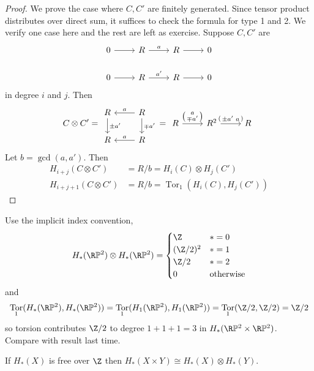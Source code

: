 \documentclass[a4paper]{article}
\renewcommand*{\P}{\mathbb{P}}
\DeclareMathOperator{\Tor}{Tor} %
\begin{document}
\begin{proof}
  We prove the case where \(C, C'\) are finitely generated. Since tensor product distributes over direct sum, it suffices to check the formula for type 1 and 2. We verify one case here and the rest are left as exercise. Suppose \(C, C'\) are
  \[
    \begin{tikzcd}
      0 \ar[r] & R \ar[r, "a"] & R \ar[r] & 0 \\
      0 \ar[r] & R \ar[r, "a'"] & R \ar[r] & 0
    \end{tikzcd}
  \]
  in degree \(i\) and \(j\). Then
  \[
    C \otimes C' =
    \begin{tikzcd}
      R \ar[d, "\pm a'"] & R \ar[d, "\mp a'"] \ar[l, "a"'] \\
      R & R \ar[l, "a"']
    \end{tikzcd}
    =
    \begin{tikzcd}[ampersand replacement=\&]
      R \ar[r, "\begin{psmallmatrix} a \\ \mp a' \end{psmallmatrix}"] \& R^2 \ar[r, "{\begin{psmallmatrix} \pm a' & a \end{psmallmatrix}}"] \& R
    \end{tikzcd}
  \]
  Let \(b = \gcd(a, a')\). Then
  \begin{align*}
    H_{i + j}(C \otimes C') &= R/b = H_i(C) \otimes H_j(C') \\
    H_{i + j + 1}(C \otimes C') &= R/b = \Tor_1(H_i(C), H_j(C'))
  \end{align*}
\end{proof}

\begin{eg}
  Use the implicit index convention,
  \[
    H_*(\R\P^2) \otimes H_*(\R\P^2) =
    \begin{cases}
      \Z & * = 0 \\
      (\Z/2)^2 & * = 1 \\
      \Z/2 & * = 2 \\
      0 & \text{otherwise}
    \end{cases}
  \]
  and
  \[
    \Tor_1(H_*(\R\P^2), H_*(\R\P^2))
    = \Tor_1(H_1(\R\P^2), H_1(\R\P^2))
    = \Tor_1(\Z/2, \Z/2)
    = \Z/2
  \]
  so torsion contributes \(\Z/2\) to degree \(1 + 1 + 1 = 3\) in \(H_*(\R\P^2 \times \R\P^2)\). Compare with result last time.
\end{eg}

\begin{corollary}
  If \(H_*(X)\) is free over \(\Z\) then \(H_*(X \times Y) \cong H_*(X) \otimes H_*(Y)\).
\end{corollary}
\end{document}
